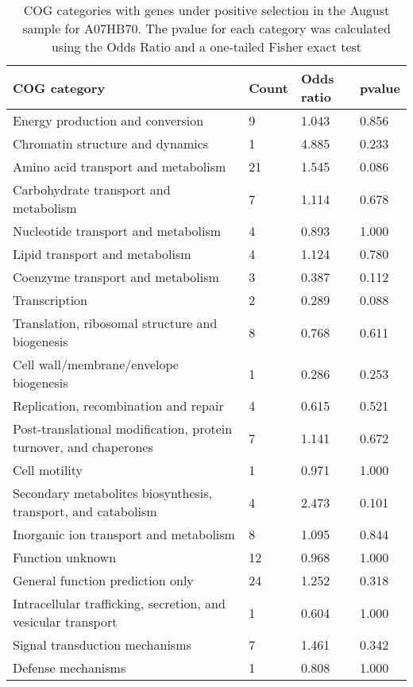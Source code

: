 \begin{table}[hb]
\footnotesize 
	\tabcolsep=0.11cm 
\caption{COG categories with genes under positive selection in the August sample for A07HB70. The pvalue for each category was calculated using the Odds Ratio and a one-tailed Fisher exact test} 
\begin{tabularx}{\textwidth}{L{6cm}R{2cm}R{2cm}R{2cm}} 
\hline 
\textbf{COG category} & \textbf{Count} & \textbf{Odds ratio} & \textbf{pvalue} \\ 
\hline 
Energy production and conversion & 9 & 1.043 & 0.856 \\ 
Chromatin structure and dynamics & 1 & 4.885 & 0.233 \\ 
Amino acid transport and metabolism & 21 & 1.545 & 0.086 \\ 
Carbohydrate transport and metabolism & 7 & 1.114 & 0.678 \\ 
Nucleotide transport and metabolism & 4 & 0.893 & 1.000 \\ 
Lipid transport and metabolism & 4 & 1.124 & 0.780 \\ 
Coenzyme transport and metabolism & 3 & 0.387 & 0.112 \\ 
Transcription & 2 & 0.289 & 0.088 \\ 
Translation, ribosomal structure and biogenesis & 8 & 0.768 & 0.611 \\ 
Cell wall/membrane/envelope biogenesis & 1 & 0.286 & 0.253 \\ 
Replication, recombination and repair & 4 & 0.615 & 0.521 \\ 
Post-translational modification, protein turnover, and chaperones & 7 & 1.141 & 0.672 \\ 
Cell motility & 1 & 0.971 & 1.000 \\ 
Secondary metabolites biosynthesis, transport, and catabolism & 4 & 2.473 & 0.101 \\ 
Inorganic ion transport and metabolism & 8 & 1.095 & 0.844 \\ 
Function unknown & 12 & 0.968 & 1.000 \\ 
General function prediction only & 24 & 1.252 & 0.318 \\ 
Intracellular trafficking, secretion, and vesicular transport & 1 & 0.604 & 1.000 \\ 
Signal transduction mechanisms & 7 & 1.461 & 0.342 \\ 
Defense mechanisms & 1 & 0.808 & 1.000 \\ 
\end{tabularx} 
\label{August_COG_Selection_A07HB70} 
 \end{table} 


